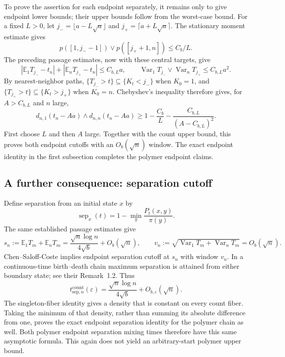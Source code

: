 To prove the assertion for each endpoint separately, it remains only to
give endpoint lower bounds; their upper bounds follow from the worst-case
bound. For a fixed $L>0$, let
$j_-=\lfloor a-L\sqrt a\rfloor$ and
$j_+=\lceil a+L\sqrt a\rceil$.
The stationary moment estimate gives
\[
 p([1,j_--1])\vee p([j_++1,n])\leq C_b/L.
\]
The preceding passage estimates, now with these central targets, give
\[
 \left|\mathbb E_1T_{j_-}-t_n\right|
 +\left|\mathbb E_nT_{j_+}-t_n\right|\leq C_{b,L}a,
 \qquad
 \operatorname{Var}_1T_{j_-}\vee\operatorname{Var}_nT_{j_+}
 \leq C_{b,L}a^2.
\]
By nearest-neighbor paths,
$\{T_{j_-}>t\}\subseteq\{K_t<j_-\}$ when $K_0=1$, and
$\{T_{j_+}>t\}\subseteq\{K_t>j_+\}$ when $K_0=n$.
Chebyshev's inequality therefore gives, for $A>C_{b,L}$ and $n$ large,
\[
 d_{n,1}(t_n-Aa)\wedge d_{n,n}(t_n-Aa)
 \geq1-\frac{C_b}{L}-\frac{C_{b,L}}{(A-C_{b,L})^2}.
\]
First choose $L$ and then $A$ large. Together with the count upper bound,
this proves both endpoint cutoffs with an $O_b(\sqrt n)$ window. The exact
endpoint identity in the first subsection completes the polymer endpoint
claims.

\subsection{A further consequence: separation cutoff}
Define separation from an initial state $x$ by
\[
 \operatorname{sep}_x(t)=1-\min_y\frac{P_t(x,y)}{\pi(y)}.
\]
The same established passage estimates give
\[
 s_n:=\mathbb E_1T_m+\mathbb E_nT_m
      =\frac{\sqrt n\log n}{4\sqrt b}+O_b(\sqrt n),\qquad
 v_n:=\sqrt{\operatorname{Var}_1T_m+\operatorname{Var}_nT_m}
      =O_b(\sqrt n).
\]
Chen--Saloff-Coste \cite[Theorem~1.3(1)]{CSC2015} implies endpoint separation cutoff at
$s_n$ with window $v_n$. In a continuous-time birth--death chain maximum
separation is attained from either boundary state; see their
Remark~1.2. Thus
\[
 t^{\mathrm{count}}_{\mathrm{sep},n}(\varepsilon)
 =\frac{\sqrt n\log n}{4\sqrt b}
       +O_{b,\varepsilon}(\sqrt n).
\]
The singleton-fiber identity gives a density that is constant on every
count fiber. Taking the minimum of that density, rather than summing its
absolute difference from one, proves the exact endpoint separation
identity for the polymer chain as well. Both polymer endpoint separation
mixing times therefore have this same asymptotic formula. This again does
not yield an arbitrary-start polymer upper bound.
